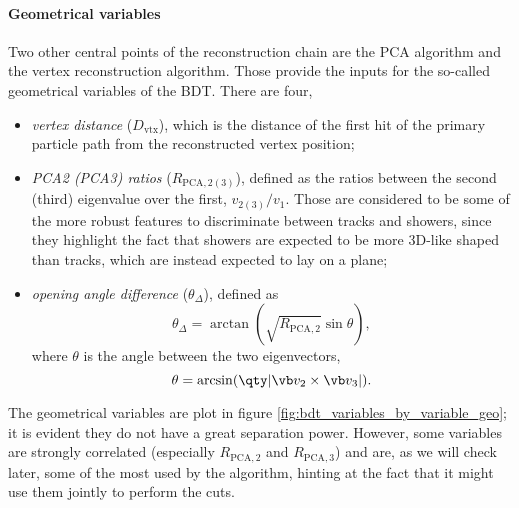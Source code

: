 \paragraph*{Geometrical variables} Two other central points of the reconstruction chain are the PCA algorithm and the vertex reconstruction algorithm. Those provide the inputs for the so-called geometrical variables of the BDT. There are four, \begin{itemize}
    \item \emph{vertex distance} ($D_\text{vtx}$), which is the distance of the first hit of the primary particle path from the reconstructed vertex position;
    \item \emph{PCA2 (PCA3) ratios} ($R_{\mathrm{PCA}, 2(3)}$), defined as the ratios between the second (third) eigenvalue over the first, $v_{2(3)}/v_1$. Those are considered to be some of the more robust features to discriminate between tracks and showers, since they highlight the fact that showers are expected to be more 3D-like shaped than tracks, which are instead expected to lay on a plane;
    \item \emph{opening angle difference} ($\theta_\Delta$), defined as \begin{equation*}
        \theta_\Delta = \arctan(\sqrt{R_{\mathrm{PCA}, 2}} \sin\theta),  
    \end{equation*} where $\theta$ is the angle between the two eigenvectors, \begin{equation*}
        \theta = \arcsin(\qty|\vb v_2 \times \vb v_3|).
    \end{equation*}
\end{itemize} The geometrical variables are plot in figure \ref{fig:bdt_variables_by_variable_geo}; it is evident they do not have a great separation power. However, some variables are strongly correlated (especially $R_\mathrm{PCA, 2}$ and $R_\mathrm{PCA, 3}$) and are, as we will check later, some of the most used by the algorithm, hinting at the fact that it might use them jointly to perform the cuts. 

